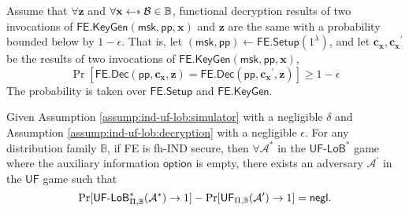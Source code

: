 \begin{assumption}
\label{assump:ind-uf-lob:decryption}
	Assume that $\forall \mathbf{z}$ and $\forall \mathbf{x} \getsdollar \mathcal{B} \in \mathbb{B}$, functional decryption results of two invocations of $\textsf{FE.KeyGen}( \textsf{msk}, \textsf{pp}, \mathbf{x})$ and $\mathbf{z}$ are the same with a probability bounded below by $1 - \epsilon$.
	That is, let $(\textsf{msk}, \textsf{pp}) \gets \textsf{FE.Setup}(1^\lambda)$, and let $\mathbf{c_x}, \mathbf{c_x}^\prime$ be the results of two invocations of $\textsf{FE.KeyGen}( \textsf{msk}, \textsf{pp}, \mathbf{x})$,
\[
	\Pr \left[
		\textsf{FE.Dec}(\textsf{pp}, \mathbf{c_x}, \mathbf{z}) = \textsf{FE.Dec}(\textsf{pp}, \mathbf{c_x}^\prime, \mathbf{z})
	\right] \geq 1 - \epsilon
\]
	The probability is taken over $\textsf{FE.Setup}$ and $\textsf{FE.KeyGen}$.

\end{assumption}


\begin{theorem}
\label{thm:ind-uf-lob2}

Given Assumption \ref{assump:ind-uf-lob:simulator} with a negligible $\delta$ and Assumption \ref{assump:ind-uf-lob:decryption} with a negligible $\epsilon$.
For any distribution family $\mathbb{B}$, if \textsf{FE} is fh-IND secure, then $\forall \mathcal{A}^*$ in the $\textsf{UF-LoB}^*$ game where the auxiliary information $\textsf{option}$ is empty, there exists an adversary $\mathcal{A}^\prime$ in the $\textsf{UF}$ game such that 
\[
	\Pr[\textsf{UF-LoB}^*_{\Pi, \mathbb{B}}(\mathcal{A}^*) \to 1] - \Pr[\textsf{UF}_{\Pi, \mathbb{B}}(\mathcal{A}^\prime) \to 1] = \mathsf{negl}.
\]

\end{theorem}


